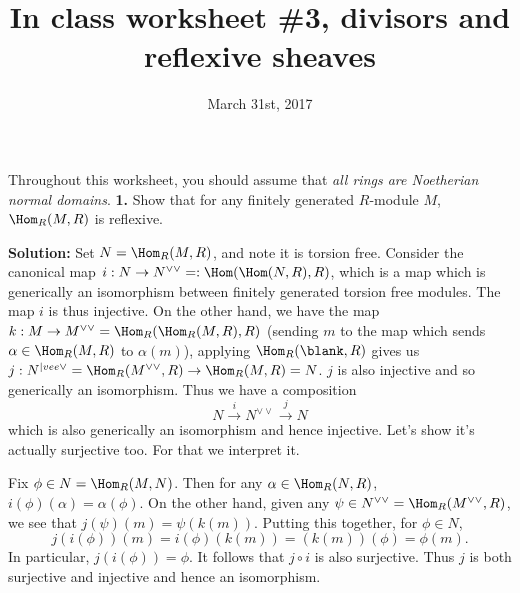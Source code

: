\documentclass[12pt]{amsart}
\numberwithin{equation}{theorem}
\renewcommand{\:}{\colon}
\theoremstyle{theorem}
\newcommand{\sol}[1]{ \vskip 6pt{\color{blue} {\bf Solution:} #1} \vskip 6pt}
\begin{document}
\title{In class worksheet \#3, divisors and reflexive sheaves}
\author{March 31st, 2017}



\maketitle

%
%
Throughout this worksheet, you should assume that \emph{all rings are Noetherian normal domains}.
\vskip 3pt
\noindent
{\bf 1.}  Show that for any finitely generated $R$-module $M$, $\Hom_R(M, R)$ is reflexive.
\noindent
\sol{Set $N = \Hom_R(M, R)$, and note it is torsion free.  Consider the canonical map $i : N \to N^{\vee \vee} =: \Hom(\Hom(N, R), R)$, which is a map which is generically an isomorphism between finitely generated torsion free modules.  The map $i$ is thus injective.  On the other hand, we have the map $k : M \to M^{\vee \vee} = \Hom_R(\Hom_R(M, R), R)$ (sending $m$ to the map which sends $\alpha \in \Hom_R(M, R)$ to $\alpha(m)$), applying $\Hom_R(\blank, R)$ gives us $j : N^{|vee \vee} = \Hom_R(M^{\vee \vee}, R) \to \Hom_R(M, R) = N$.  $j$ is also injective and so generically an isomorphism.  Thus we have a composition
\[
N \xrightarrow{i} N^{\vee \vee} \xrightarrow{j} N
\]
which is also generically an isomorphism and hence injective.  Let's show it's actually surjective too.  For that we interpret it.

Fix $\phi \in N = \Hom_R(M, N)$.  Then for any $\alpha \in \Hom_R(N, R)$, $i(\phi)(\alpha) = \alpha(\phi)$.  On the other hand, given any $\psi \in N^{\vee \vee} = \Hom_R(M^{\vee \vee}, R)$, we see that $j(\psi)(m) = \psi(k(m))$.  Putting this together, for $\phi \in N$,
\[
j(i(\phi))(m) = i(\phi)(k(m)) = (k(m))(\phi) = \phi(m).
\]
In particular, $j(i(\phi)) = \phi$.  It follows that $j \circ i$ is also surjective.  Thus $j$ is both surjective and injective and hence an isomorphism.
}
\end{document}
